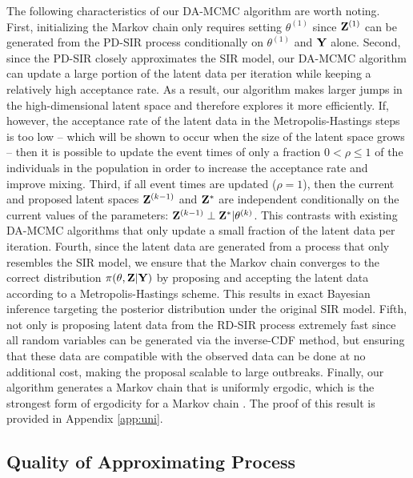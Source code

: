 \documentclass[11pt]{article}
\begin{document}
	The following characteristics of our DA-MCMC algorithm are worth noting.
	First, initializing the Markov chain only requires setting $\theta^{(1)}$ since  $\mathbf{Z}^{(1)}$ can be generated from the PD-SIR process conditionally on $\theta^{(1)}$ and $\mathbf{Y}$ alone.
	Second, since the PD-SIR closely approximates the SIR model, our DA-MCMC algorithm can update a large portion of the latent data per iteration while keeping a relatively high acceptance rate. As a result, our algorithm makes larger jumps in the high-dimensional latent space and therefore explores it more efficiently. If, however, the acceptance rate of the latent data in the Metropolis-Hastings steps is too low -- which will be shown to occur when the size of the latent space grows -- then it is possible to update the event times of only a fraction $0<\rho\le 1$ of the individuals in the population in order to increase the acceptance rate and improve mixing.
	Third, if all event times are updated ($\rho = 1$), then the current and proposed latent spaces $\mathbf{Z}^{(k-1)}$ and $\mathbf{Z}^*$ are independent conditionally on the current values of the parameters: $\mathbf{Z}^{(k-1)} \perp \mathbf{Z}^* | \theta^{(k)}$. This contrasts with existing DA-MCMC algorithms that only update a small fraction of the latent data per iteration.
	Fourth, since the latent data are generated from a process that only resembles the SIR model, we ensure that the Markov chain converges to the correct distribution $\pi(\theta, \mathbf{Z}|\mathbf{Y})$ by proposing and accepting the latent data according to a Metropolis-Hastings scheme. This results in exact Bayesian inference targeting the posterior distribution under the original SIR model.
	Fifth, not only is proposing latent data from the RD-SIR process extremely fast since all random variables can be generated via the inverse-CDF method, but ensuring that these data are compatible with the observed data can be done at no additional cost, making the proposal scalable to large outbreaks.
	Finally, our algorithm generates a Markov chain that is uniformly ergodic, which is the strongest form of ergodicity for a Markov chain \cite{Tierney.1994}. The proof of this result is provided in Appendix \ref{app:uni}.
		
	\subsection{Quality of Approximating Process}
	\label{sec:qua}
	
\end{document}

